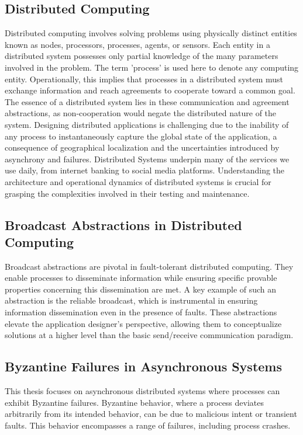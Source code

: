 \documentclass[a4paper,11pt,oneside]{report}
\begin{document}
\subsection{Distributed Computing}
Distributed computing involves solving problems using physically distinct entities known as nodes, processors, processes, agents, or sensors. Each entity in a distributed system possesses only partial knowledge of the many parameters involved in the problem. The term 'process' is used here to denote any computing entity. Operationally, this implies that processes in a distributed system must exchange information and reach agreements to cooperate toward a common goal. The essence of a distributed system lies in these communication and agreement abstractions, as non-cooperation would negate the distributed nature of the system. Designing distributed applications is challenging due to the inability of any process to instantaneously capture the global state of the application, a consequence of geographical localization and the uncertainties introduced by asynchrony and failures.
Distributed Systems underpin many of the services we use daily, from internet banking to social media platforms. Understanding the architecture and operational dynamics of distributed systems is crucial for grasping the complexities involved in their testing and maintenance.

\subsection{Broadcast Abstractions in Distributed Computing}
Broadcast abstractions are pivotal in fault-tolerant distributed computing. They enable processes to disseminate information while ensuring specific provable properties concerning this dissemination are met. A key example of such an abstraction is the reliable broadcast, which is instrumental in ensuring information dissemination even in the presence of faults. These abstractions elevate the application designer's perspective, allowing them to conceptualize solutions at a higher level than the basic send/receive communication paradigm.

\subsection{Byzantine Failures in Asynchronous Systems}
This thesis focuses on asynchronous distributed systems where processes can exhibit Byzantine failures. Byzantine behavior, where a process deviates arbitrarily from its intended behavior, can be due to malicious intent or transient faults. This behavior encompasses a range of failures, including process crashes. 
\end{document}
